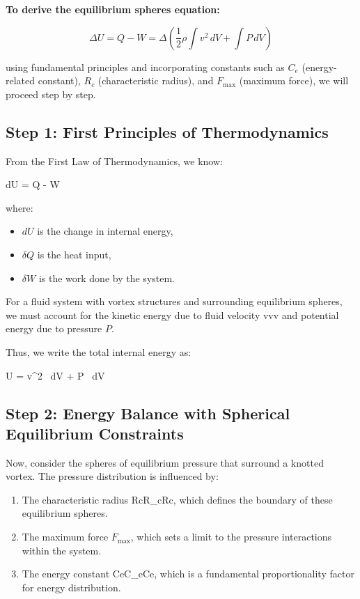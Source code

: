 

\textbf{To derive the equilibrium spheres equation:}

\[
\Delta U = Q - W = \Delta \left( \frac{1}{2} \rho \int v^2 \, dV + \int P \, dV \right)
\]

using fundamental principles and incorporating constants such as $C_e$ (energy-related constant), $R_c$ (characteristic radius), and $F_{\max}$ (maximum force), we will proceed step by step.





\subsection*{Step 1: First Principles of Thermodynamics}
From the First Law of Thermodynamics, we know:

dU = \delta Q - \delta W

where:

\begin{itemize}
\item $dU$ is the change in internal energy,
\item $\delta Q$ is the heat input,
\item $\delta W$ is the work done by the system.
\end{itemize}
For a fluid system with vortex structures and surrounding equilibrium spheres, we must account for the kinetic energy due to fluid velocity vvv and potential energy due to pressure $P$.

Thus, we write the total internal energy as:

U =  \rho \int v^2 \, dV + \int P \, dV



\subsection*{Step 2: Energy Balance with Spherical Equilibrium Constraints}
Now, consider the spheres of equilibrium pressure that surround a knotted vortex. The pressure distribution is influenced by:

\begin{enumerate}
\item The characteristic radius RcR_cRc, which defines the boundary of these equilibrium spheres.
\item The maximum force $F_{\max}$, which sets a limit to the pressure interactions within the system.
\item The energy constant CeC_eCe, which is a fundamental proportionality factor for energy distribution.
\end{enumerate}
